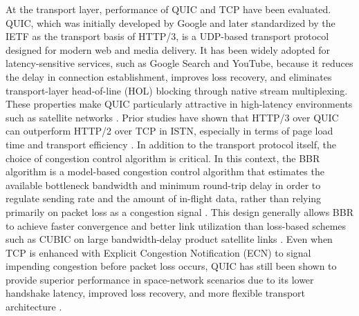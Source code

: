 \documentclass[journal]{IEEEtran}
\begin{document}
At the transport layer, performance of QUIC and TCP have been evaluated. QUIC, which was initially developed by Google and later standardized by the IETF as the transport basis of HTTP/3, is a UDP-based transport protocol designed for modern web and media delivery. It has been widely adopted for latency-sensitive services, such as Google Search and YouTube, because it reduces the delay in connection establishment, improves loss recovery, and eliminates transport-layer head-of-line (HOL) blocking through native stream multiplexing. These properties make QUIC particularly attractive in high-latency environments such as satellite networks \cite{Alshagri2023, Yang2018}. Prior studies have shown that HTTP/3 over QUIC can outperform HTTP/2 over TCP in ISTN, especially in terms of page load time and transport efficiency \cite{Yang2018}. In addition to the transport protocol itself, the choice of congestion control algorithm is critical. In this context, the BBR algorithm is a model-based congestion control algorithm that estimates the available bottleneck bandwidth and minimum round-trip delay in order to regulate sending rate and the amount of in-flight data, rather than relying primarily on packet loss as a congestion signal \cite{IETFBBR}. This design generally allows BBR to achieve faster convergence and better link utilization than loss-based schemes such as CUBIC on large bandwidth-delay product satellite links \cite{Alshagri2023}. Even when TCP is enhanced with Explicit Congestion Notification (ECN) to signal impending congestion before packet loss occurs, QUIC has still been shown to provide superior performance in space-network scenarios due to its lower handshake latency, improved loss recovery, and more flexible transport architecture \cite{Yang2018, Alshagri2023}.
\end{document}

